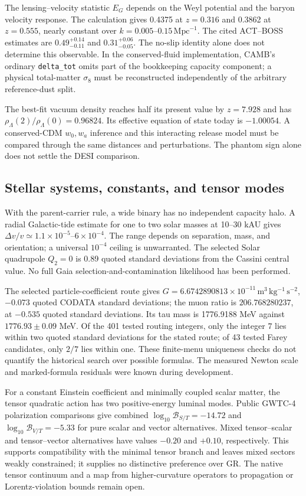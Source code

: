 The lensing--velocity statistic $E_G$ depends on the Weyl potential and
the baryon velocity response. The calculation gives 0.4375 at
$z=0.316$ and 0.3862 at $z=0.555$, nearly constant over
$k=0.005$--$0.15\,\mathrm{Mpc}^{-1}$. The cited ACT--BOSS estimates
are $0.49^{+0.14}_{-0.11}$ and $0.31^{+0.06}_{-0.05}$.
The no-slip identity alone does not determine this observable.
In the conserved-fluid implementation, CAMB's ordinary
\texttt{delta\_tot} omits part of the bookkeeping capacity component;
a physical total-matter $\sigma_8$ must be reconstructed independently
of the arbitrary reference-dust split. 

The best-fit vacuum density reaches half its present value by
$z=7.928$ and has $\rho_\Lambda(2)/\rho_\Lambda(0)=0.96824$.
Its effective equation of state today is $-1.00054$. A conserved-CDM
$w_0,w_a$ inference and this interacting release model must be compared
through the same distances and perturbations. The phantom sign alone
does not settle the DESI comparison. 

\subsection{Stellar systems, constants, and tensor modes}
With the parent-carrier rule, a wide binary has no independent capacity
halo. A radial Galactic-tide estimate for one to two solar masses at
10--30 kAU gives $\Delta v/v\simeq1.1\times10^{-5}$--$6\times10^{-4}$.
The range depends on separation, mass, and orientation; a universal
$10^{-4}$ ceiling is unwarranted. The selected Solar quadrupole
$Q_2=0$ is 0.89 quoted standard deviations from the Cassini central
value. No full Gaia selection-and-contamination likelihood has been
performed. 

The selected particle-coefficient route gives
$G=6.6742890813\times10^{-11}\,\mathrm{m^3\,kg^{-1}\,s^{-2}}$,
$-0.073$ quoted CODATA standard deviations; the muon ratio is
$206.768280237$, at $-0.535$ quoted standard deviations. Its tau mass
is 1776.9188 MeV against $1776.93\pm0.09$ MeV. Of the 401 tested
routing integers, only the integer $7$ lies within two quoted standard deviations
for the stated route; of 43 tested Farey candidates, only $2/7$ lies
within one. These finite-menu uniqueness checks do not quantify the
historical search over possible formulas. The measured Newton scale
and marked-formula residuals were known during development.

For a constant Einstein coefficient and minimally coupled scalar matter,
the tensor quadratic action has two positive-energy luminal modes.
Public GWTC-4 polarization comparisons give combined
$\log_{10}\mathcal B_{S/T}=-14.72$ and
$\log_{10}\mathcal B_{V/T}=-5.33$ for pure scalar and vector
alternatives. Mixed tensor--scalar and tensor--vector alternatives
have values $-0.20$ and $+0.10$, respectively. This supports
compatibility with the minimal tensor branch and leaves mixed sectors
weakly constrained; it supplies no distinctive preference over GR.
The native tensor continuum and a map from higher-curvature operators
to propagation or Lorentz-violation bounds remain open.

